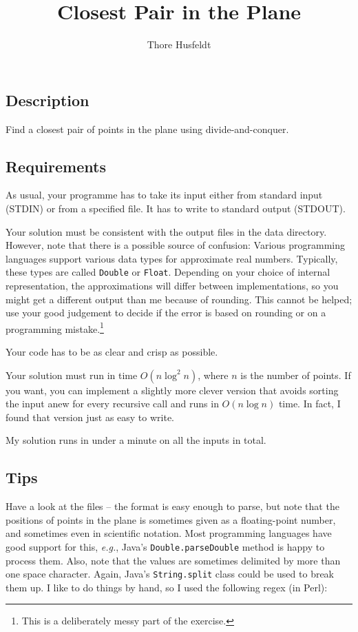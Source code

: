 \documentclass{tufte-handout}
\title{Closest Pair in the Plane}
\author{Thore Husfeldt}
\begin{document}
\maketitle

\subsection{Description}
Find a closest pair of points in the plane using divide-and-conquer.

\subsection{Requirements}
As usual, your programme has to take its input either from standard input (STDIN) or from a specified file.
It has to write to standard output (STDOUT).

Your solution must be consistent with the output files in the data directory.
However, note that there is a possible source of confusion:
Various programming languages support various data types for approximate real numbers.
Typically, these types are called {\tt Double} or {\tt Float}.
Depending on your choice of internal representation, the approximations will differ between implementations, so you might get a different output than me because of rounding.
This cannot be helped; use your good judgement to decide if the error is based on rounding or on a programming mistake.\footnote{This is a deliberately messy part of the exercise.}

Your code has to be as clear and crisp as possible.

Your solution must run in time $O(n\log^2 n)$, where $n$ is the number of points.
If you want, you can implement a slightly more clever version that avoids sorting the input anew for every recursive call and runs in $O(n\log n)$ time.
In fact, I found that version just as easy to write.

My solution runs in under a minute on all the inputs in total.

\subsection{Tips}

Have a look at the files – the format is easy enough to parse, but note that the positions of points in the plane is sometimes given as a floating-point number, and sometimes even in scientific notation.
Most programming languages have good support for this, \emph{e.g.}, Java’s {\tt Double.parseDouble} method is happy to process them.
Also, note that the values are sometimes delimited by more than one space character. Again, Java’s {\tt String.split} class could be used to break them up.
I like to do things by hand, so I used the following regex (in Perl):
\end{document}
